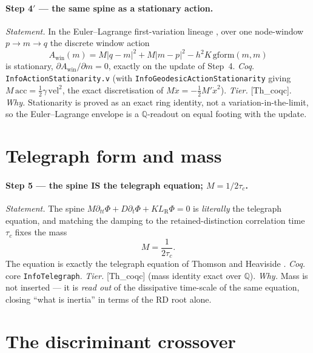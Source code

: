 \documentclass[10pt,twocolumn]{article}
\theoremstyle{definition}
\newcommand{\Thq}{\textsf{[Th\_coqc]}}   %
\newcommand{\code}[1]{\texttt{#1}}
\newcommand{\LR}{L_{\mathrm R}}
\begin{document}
\paragraph{Step 4$'$ --- the same spine as a stationary action.}
\emph{Statement.} In the Euler--Lagrange first-variation lineage
\cite{euler1744,lagrange1788}, over one node-window $p\to m\to q$ the discrete window action
\[
  A_{\mathrm{win}}(m)=M|q-m|^2+M|m-p|^2-h^2K\,\mathrm{gform}(m,m)
\]
is stationary, $\partial A_{\mathrm{win}}/\partial m=0$, exactly on the update
of Step~4. \emph{Coq.} \code{InfoActionStationarity.v}
(with \code{InfoGeodesicActionStationarity} giving $M\,\mathrm{acc}=\tfrac12\gamma
\,\mathrm{vel}^2$, the exact discretisation of $M\ddot x=-\tfrac12 M'\dot x^2$).
\emph{Tier.} \Thq{}. \emph{Why.} Stationarity is proved as an exact ring
identity, not a variation-in-the-limit, so the Euler--Lagrange envelope is a
$\mathbb{Q}$-readout on equal footing with the update.

\section{Telegraph form and mass}\label{sec:telegraph}
\paragraph{Step 5 --- the spine IS the telegraph equation; $M=1/2\tau_c$.}
\emph{Statement.} The spine $M\partial_{tt}\Phi+D\partial_t\Phi+K\LR\Phi=0$ is
\emph{literally} the telegraph equation, and matching the damping to the
retained-distinction correlation time $\tau_c$ fixes the mass
\[
  M=\frac{1}{2\tau_c}.
\]
The equation is exactly the telegraph equation of Thomson and Heaviside
\cite{thomson1855,heaviside1893}.
\emph{Coq.} core \code{InfoTelegraph}. \emph{Tier.} \Thq{} (mass identity exact
over $\mathbb{Q}$). \emph{Why.} Mass is not inserted --- it is \emph{read out}
of the dissipative time-scale of the same equation, closing ``what is inertia''
in terms of the RD root alone.

\section{The discriminant crossover}\label{sec:crossover}
\end{document}
